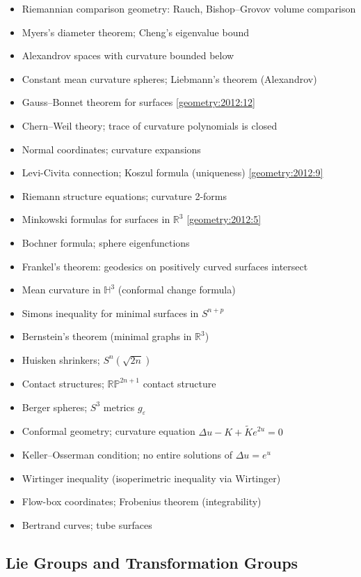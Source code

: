 \begin{itemize}
  \item Riemannian comparison geometry: Rauch, Bishop--Grovov volume comparison
  \item Myers's diameter theorem; Cheng's eigenvalue bound
  \item Alexandrov spaces with curvature bounded below
  \item Constant mean curvature spheres; Liebmann's theorem (Alexandrov)
  \item Gauss--Bonnet theorem for surfaces \hfill \cref{geometry:2012:12}
  \item Chern--Weil theory; trace of curvature polynomials is closed
  \item Normal coordinates; curvature expansions
  \item Levi-Civita connection; Koszul formula (uniqueness) \hfill \cref{geometry:2012:9}
  \item Riemann structure equations; curvature 2-forms
  \item Minkowski formulas for surfaces in $\mathbb{R}^3$ \hfill \cref{geometry:2012:5}
  \item Bochner formula; sphere eigenfunctions
  \item Frankel's theorem: geodesics on positively curved surfaces intersect
  \item Mean curvature in $\mathbb{H}^3$ (conformal change formula)
  \item Simons inequality for minimal surfaces in $S^{n+p}$
  \item Bernstein's theorem (minimal graphs in $\mathbb{R}^3$)
  \item Huisken shrinkers; $S^n(\sqrt{2n})$
  \item Contact structures; $\mathbb{RP}^{2n+1}$ contact structure
  \item Berger spheres; $S^3$ metrics $g_\varepsilon$
  \item Conformal geometry; curvature equation $\Delta u-K+\widetilde{K}e^{2u}=0$
  \item Keller--Osserman condition; no entire solutions of $\Delta u=e^u$
  \item Wirtinger inequality (isoperimetric inequality via Wirtinger)
  \item Flow-box coordinates; Frobenius theorem (integrability)
  \item Bertrand curves; tube surfaces
\end{itemize}

\subsection{Lie Groups and Transformation Groups}

